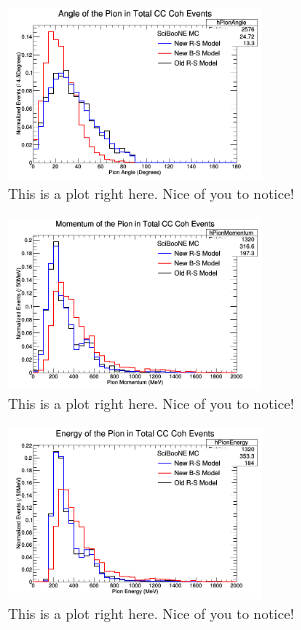\documentclass[11pt]{article}
\begin{document}
\begin{figure}[H]
\centering
\includegraphics[width=0.6\textwidth]{NMPionPlottingImages/10-NMPionPlotting.png}
\caption{This is a plot right here. Nice of you to notice!}
\end{figure}

\begin{figure}[H]
\centering
\includegraphics[width=0.6\textwidth]{NMPionPlottingImages/11-NMPionPlotting.png}
\caption{This is a plot right here. Nice of you to notice!}
\end{figure}

\begin{figure}[H]
\centering
\includegraphics[width=0.6\textwidth]{NMPionPlottingImages/12-NMPionPlotting.png}
\caption{This is a plot right here. Nice of you to notice!}
\end{figure}

\end{document}
